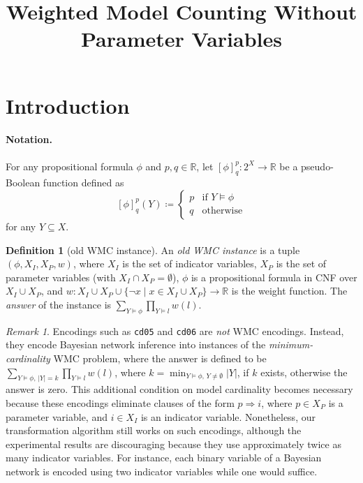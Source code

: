 \documentclass{article}
\title{Weighted Model Counting Without Parameter Variables}
\theoremstyle{definition}
\newtheorem{definition}{Definition}
\theoremstyle{remark}
\newtheorem*{remark}{Remark}
\begin{document}
\maketitle

\section{Introduction}

\paragraph{Notation.} For any propositional formula $\phi$ and $p, q \in
\mathbb{R}$, let $[\phi]^p_q\colon 2^X \to \mathbb{R}$ be a
pseudo-Boolean function defined as
\[
  [\phi]^p_q(Y) \coloneqq
  \begin{cases}
    p & \text{if } Y \models \phi \\
    q & \text{otherwise}
  \end{cases}
\]
for any $Y \subseteq X$.

\begin{definition}[old WMC instance]
  An \emph{old WMC instance} is a tuple $(\phi, X_I, X_P, w)$, where $X_I$ is
  the set of indicator variables, $X_P$ is the set of parameter variables (with
  $X_I \cap X_P = \emptyset$), $\phi$ is a propositional formula in CNF over
  $X_I \cup X_P$, and $w\colon X_I \cup X_P \cup \{\neg x \mid x \in X_I \cup
  X_P\} \to \mathbb{R}$ is the weight function. The \emph{answer} of the
  instance is $\sum_{Y \models \phi} \prod_{Y \models l} w(l)$.
\end{definition} %

\begin{remark}
  Encodings such as \texttt{cd05} and \texttt{cd06} are \emph{not} WMC
  encodings. Instead, they encode Bayesian network inference into instances of
  the \emph{minimum-cardinality} WMC problem, where the answer is defined to be
  $\sum_{Y \models \phi\text{, }|Y| = k} \prod_{Y \models l}
  w(l)$, where $k = \min_{Y \models \phi\text{, }Y \ne \emptyset}
  |Y|$, if $k$ exists, otherwise the answer is zero. This additional
  condition on model cardinality becomes necessary because these encodings
  eliminate clauses of the form $p \Rightarrow i$, where $p \in X_P$ is a
  parameter variable, and $i \in X_I$ is an indicator variable. Nonetheless, our
  transformation algorithm still works on such encodings, although the
  experimental results are discouraging because they use approximately twice as
  many indicator variables. For instance, each binary variable of a Bayesian
  network is encoded using two indicator variables while one would suffice.
\end{remark} %
\end{document}
